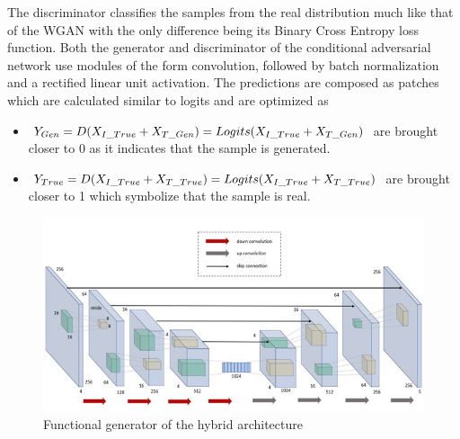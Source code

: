 \documentclass{Configuration_Files/PoliMi3i_thesis}
\begin{document}
The discriminator classifies the samples from the real distribution much like that of 
the WGAN with the only difference being its Binary Cross Entropy loss function.
Both the generator and discriminator of the conditional adversarial network use 
modules of the form convolution, followed by batch normalization and a rectified 
linear unit activation. The predictions are composed as patches which are calculated 
similar to logits and are optimized as 
\begin{itemize}
\item $Y_{Gen} = D(X_{I\char`_True}+X_{T\char`_Gen}) = Logits(X_{I\char`_True}+X_{T\char`_Gen})$ are brought closer to 0 as it indicates that the
sample is generated.
\item $Y_{True} = D(X_{I\char`_True}+X_{T\char`_True}) = Logits(X_{I\char`_True}+X_{T\char`_True})$ are brought closer to 1 which symbolize that the sample is real. 
\end{itemize}
\begin{figure}[H]
    \centering
    \includegraphics[width=1\textwidth]{unet.jpg}
    \caption{Functional generator of the hybrid architecture}
    \label{fig:unet}
\end{figure}
\end{document}
